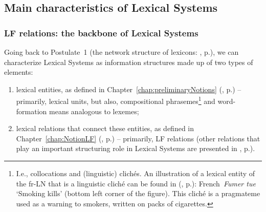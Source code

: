 \subsection{Main characteristics of Lexical Systems}\label{sec:mainCharacteristicsLS}

\subsubsection{LF relations: the backbone of Lexical Systems}\label{sec:LFRelationsBackboneOfLFs}

Going back to Postulate~1 (the network structure of lexicons: , p.\thinspace\pageref{txt:postulateStrucLexicons}), we can characterize Lexical Systems as information structures made up of two types of elements:

\begin{enumerate}

\item lexical entities, as defined in Chapter~\ref{chap:preliminaryNotions} (, p.\thinspace\pageref{txt:lexicalEntityDef}) -- primarily, lexical units, but also, compositional phrasemes\footnote{I.e., collocations and (linguistic) clichés. An illustration of a lexical entity of the fr-LN that is a linguistic cliché can be found in  (, p.\thinspace\pageref{fig:proxemyCIGARETTE}): {\smaller French}~\textit{Fumer tue} `Smoking kills' (bottom left corner of the figure). This cliché is a pragmateme \parencite{Melcuk2020a} used as a warning to smokers, written on packs of cigarettes.} and word-formation means analogous to lexemes;

\item lexical relations that connect these entities, as defined in Chapter~\ref{chap:NotionLF} (, p.\thinspace\pageref{txt:lexicalRelationIntro}) -- primarily, LF relations (other relations that play an important structuring role in Lexical Systems are presented in , p.\thinspace\pageref{sec:non-LFRelationsInLSs}).

\end{enumerate}


